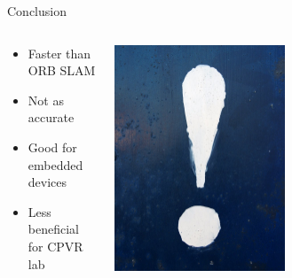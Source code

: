 \documentclass[aspectratio=169]{beamer}
\begin{document}
\begin{frame}{Conclusion}
  \begin{columns}[c]
    \begin{column}{0.4\linewidth}
      \begin{itemize}
        \item Faster than ORB SLAM
        \item Not as accurate
        \item Good for embedded devices
        \item Less beneficial for CPVR lab
      \end{itemize}
    \end{column}
    \begin{column}{0.4\linewidth}
      \begin{center}
        \includegraphics[width=0.5\textwidth]{./img/exclamationmark.jpg}
      \end{center}
    \end{column}
  \end{columns}
\end{frame}
\end{document}
